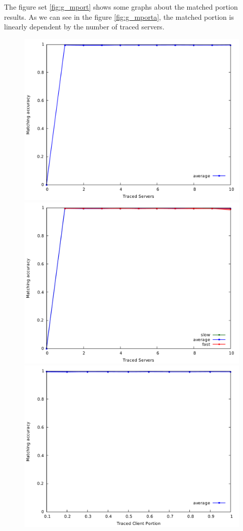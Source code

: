 The figure set \ref{fig:g_mport} shows some graphs about the matched
portion results. As we can see in the figure \ref{fig:g_mporta}, the
matched portion is linearly dependent by the number of traced servers. 
\begin{figure}[H]
\centering
\includegraphics[scale=0.35]{graphs/s_server_pmatch_average_only.pdf}
\includegraphics[scale=0.35]{graphs/s_server_pmatch.pdf}
\includegraphics[scale=0.35]{graphs/c_tclient_pmatch_average_only.pdf}

\end{figure}
